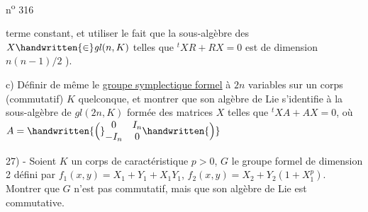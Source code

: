 \hfill n\textsuperscript{o} 316

terme constant, et utiliser le fait que la sous-algèbre des $X\handwritten{\in}\mathit{gl}(n,K)$ telles que $ {}^{t}XR+RX=0$ est de dimension $n(n-1)/2$ ).

c) Définir de même le \uline{groupe symplectique formel} à $2n$ variables sur un corps (commutatif) $K$ quelconque, et montrer que son algèbre de Lie s'identifie à la sous-algèbre de $\mathit{gl}(2n,K)$ formée des matrices $X$ telles que $ {}^{t}XA+AX=0$, où $A=\handwritten{\Bigl(}\begin{matrix}0&I_n\\-I_n&0\end{matrix}\handwritten{\Bigr)}$

27) - Soient $K$ un corps de caractéristique $p>0$, $G$ le groupe formel de dimension 2 défini par $f_1(x,y)=X_1+Y_1+X_1Y_1$, $f_2(x,y)=X_2+Y_2(1+X_1^p)$. Montrer que $G$ n'est pas commutatif, mais que son algèbre de Lie est commutative.
